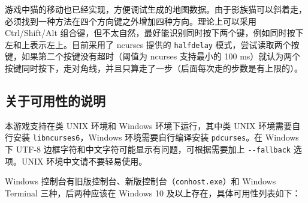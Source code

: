 \documentclass[hyperref,UTF8,a4paper]{ctexart}
\begin{document}
游戏中猫的移动也已经实现，方便调试生成的地图数据。由于影族猫可以斜着走，必须找到一种方法在四个方向键之外增加四种方向。理论上可以采用
Ctrl/Shift/Alt
组合键，但不太自然，最好能识别同时按下两个键，例如同时按下左和上表示左上。目前采用了
ncurses 提供的 \texttt{halfdelay}
模式，尝试读取两个按键，如果第二个按键没有超时（阈值为 ncurses
支持最小的 100
ms）就认为两个按键同时按下，走对角线，并且只算走了一步（后面每次走的步数是有上限的）。

\hypertarget{ux5173ux4e8eux53efux7528ux6027ux7684ux8bf4ux660e}{%
\subsection{关于可用性的说明}\label{ux5173ux4e8eux53efux7528ux6027ux7684ux8bf4ux660e}}

本游戏支持在类 UNIX 环境和 Windows 环境下运行，其中类 UNIX
环境需要自行安装 \texttt{libncurses6}，Windows 环境需要自行编译安装
\texttt{pdcurses}。在 Windows 下 UTF-8
边框字符和中文字符可能显示有问题，可根据需要加上 \texttt{-\/-fallback}
选项。UNIX 环境中文请不要轻易使用。

Windows 控制台有旧版控制台、新版控制台（\texttt{conhost.exe}）和 Windows
Terminal 三种，后两种应该在 Windows 10 及以上存在，具体可用性列表如下：
\end{document}
